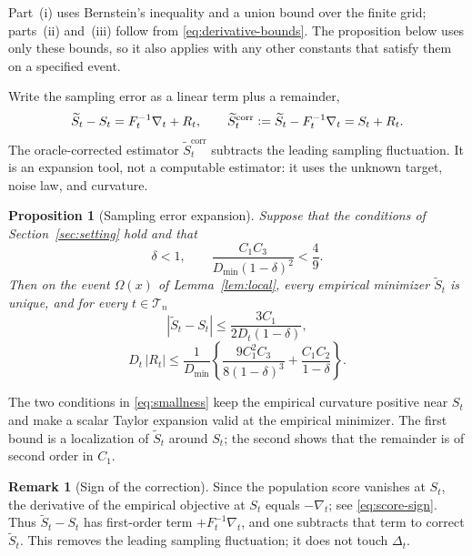 \documentclass[11pt]{article}
\newcommand{\eqdef}{\mathrel{\vcentcolon=}}
\newcommand{\IMFs}{S}
\newcommand{\IMFt}{\widetilde S}
\newcommand{\IF}{F}
\newcommand{\DFN}{D}
\newcommand{\xx}{x}
\newtheorem{proposition}{Proposition}[section]
\theoremstyle{definition}
\newtheorem*{remark}{Remark}
\begin{document}
Part~(i) uses Bernstein's inequality and a union bound over the finite grid;
parts~(ii) and~(iii) follow from \eqref{eq:derivative-bounds}.  The
proposition below uses only these bounds, so it also applies with any other
constants that satisfy them on a specified event.

Write the sampling error as a linear term plus a remainder,
\begin{equation}
  \IMFt_t-\IMFs_t=\IF_t^{-1}\nabla_t+R_t,
  \qquad
  \IMFt_t^{\mathrm{corr}}\eqdef\IMFt_t-\IF_t^{-1}\nabla_t
  =\IMFs_t+R_t.
  \label{eq:corrected-estimator}
\end{equation}
The oracle-corrected estimator \(\IMFt_t^{\mathrm{corr}}\) subtracts the
leading sampling fluctuation.  It is an expansion tool, not a computable
estimator: it uses the unknown target, noise law, and curvature.

\begin{proposition}[Sampling error expansion]\label{prop:main}
Suppose that the conditions of Section~\ref{sec:setting} hold and that
\begin{equation}
  \delta<1,
  \qquad
  \frac{C_1C_3}{\DFN_{\min}(1-\delta)^2}<\frac49.
  \label{eq:smallness}
\end{equation}
Then on the event \(\Omega(\xx)\) of Lemma~\ref{lem:local}, every empirical
minimizer \(\IMFt_t\) is unique, and for every \(t\in\mathcal T_n\)
\begin{equation}
  |\IMFt_t-\IMFs_t|
    \leq\frac{3C_1}{2\DFN_t(1-\delta)},
  \label{eq:raw-localization}
\end{equation}
\begin{equation}
  \DFN_t\,|R_t|
  \leq
  \frac{1}{\DFN_{\min}}
  \left\{
    \frac{9C_1^2C_3}{8(1-\delta)^3}
    +\frac{C_1C_2}{1-\delta}
  \right\}.
  \label{eq:proposition-bound}
\end{equation}
\end{proposition}

The two conditions in \eqref{eq:smallness} keep the empirical curvature
positive near \(\IMFs_t\) and make a scalar Taylor expansion valid at the
empirical minimizer.  The first bound is a localization of \(\IMFt_t\)
around \(\IMFs_t\); the second shows that the remainder is of second order in
\(C_1\).

\begin{remark}[Sign of the correction]
Since the population score vanishes at \(\IMFs_t\), the derivative of the
empirical objective at \(\IMFs_t\) equals \(-\nabla_t\); see
\eqref{eq:score-sign}.  Thus \(\IMFt_t-\IMFs_t\) has first-order term
\(+\IF_t^{-1}\nabla_t\), and one subtracts that term to correct
\(\IMFt_t\).  This removes the leading sampling fluctuation; it does not
touch \(\Delta_t\).
\end{remark}
\end{document}
